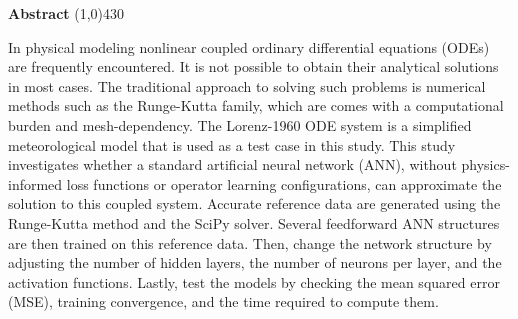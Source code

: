 \setlength{\headheight}{14pt}
\begin{center}
	{\huge \bf Abstract}
	\line(1,0){430}
\end{center}
In physical modeling nonlinear coupled ordinary differential equations (ODEs) are frequently encountered. It is not possible to obtain their analytical solutions in most cases. The traditional approach to solving such problems is numerical methods such as the Runge-Kutta family, which are comes with a computational burden and mesh-dependency. The Lorenz-1960 ODE system is a simplified meteorological model that is used as a test case in this study. This study investigates whether a standard artificial neural network (ANN), without physics-informed loss functions or operator learning configurations, can approximate the solution to this coupled system. Accurate reference data are generated using the Runge-Kutta method and the SciPy solver. Several feedforward ANN structures are then trained on this reference data. Then, change the network structure by adjusting the number of hidden layers, the number of neurons per layer, and the activation functions. Lastly, test the models by checking the mean squared error (MSE), training convergence, and the time required to compute them.

\clearpage
\setlength{\headheight}{12pt}